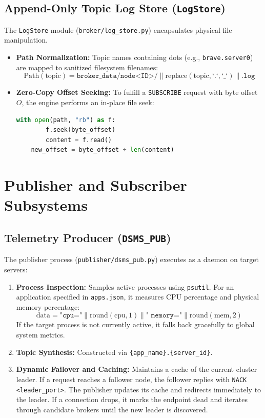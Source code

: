 \documentclass[11pt,a4paper]{article}
\begin{document}
\subsection{Append-Only Topic Log Store (\texttt{LogStore})}
The \texttt{LogStore} module (\texttt{broker/log\_store.py}) encapsulates physical file manipulation.
\begin{itemize}[leftmargin=*]
    \item \textbf{Path Normalization:} Topic names containing dots (e.g., \texttt{brave.server0}) are mapped to sanitized filesystem filenames:
    \begin{equation}
    \text{Path}(\text{topic}) = \texttt{broker\_data/node<ID>/} \parallel \text{replace}(\text{topic}, \text{`.`}, \text{`\_`}) \parallel \texttt{.log}
    \end{equation}
    \item \textbf{Zero-Copy Offset Seeking:} To fulfill a \texttt{SUBSCRIBE} request with byte offset $O$, the engine performs an in-place file seek:
    \begin{lstlisting}[language=Python]
    with open(path, "rb") as f:
        f.seek(byte_offset)
        content = f.read()
    new_offset = byte_offset + len(content)
    \end{lstlisting}
\end{itemize}

\section{Publisher and Subscriber Subsystems}
\label{sec:pubsub}

\subsection{Telemetry Producer (\texttt{DSMS\_PUB})}
The publisher process (\texttt{publisher/dsms\_pub.py}) executes as a daemon on target servers:
\begin{enumerate}[leftmargin=*]
    \item \textbf{Process Inspection:} Samples active processes using \texttt{psutil}. For an application specified in \texttt{apps.json}, it measures CPU percentage and physical memory percentage:
    \begin{equation}
    \text{data} = \texttt{"cpu="} \parallel \text{round}(\text{cpu}, 1) \parallel \texttt{" memory="} \parallel \text{round}(\text{mem}, 2)
    \end{equation}
    If the target process is not currently active, it falls back gracefully to global system metrics.
    \item \textbf{Topic Synthesis:} Constructed via \texttt{\{app\_name\}.\{server\_id\}}.
    \item \textbf{Dynamic Failover and Caching:} Maintains a cache of the current cluster leader. If a request reaches a follower node, the follower replies with \texttt{NACK <leader\_port>}. The publisher updates its cache and redirects immediately to the leader. If a connection drops, it marks the endpoint dead and iterates through candidate brokers until the new leader is discovered.
\end{enumerate}
\end{document}
